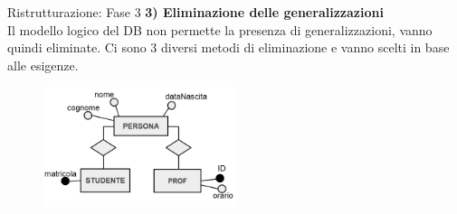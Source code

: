 %
\begin{frame}{Ristrutturazione: Fase 3}
\textbf{3) Eliminazione delle generalizzazioni}
\\\vspace{2em}
Il modello logico del DB non permette la presenza di generalizzazioni, vanno quindi eliminate. Ci sono 3 diversi metodi di eliminazione e vanno scelti in base alle esigenze.
\begin{figure}[h]
        \centering
        \includegraphics[width=0.5\textwidth]{img/i6.png}
    \end{figure}
\end{frame}
%
